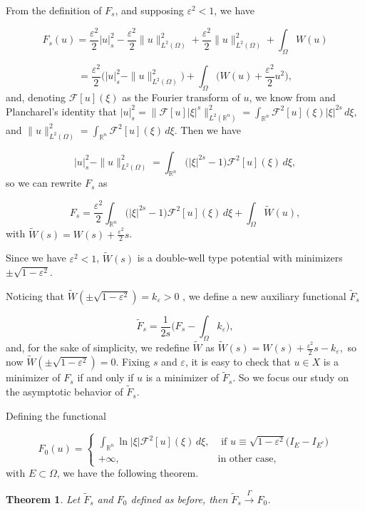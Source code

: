 \documentclass{amsart}
\newcommand{\rn}{{\mathbb{R}^n}}
\newcommand{\e}{\varepsilon}
\newcommand{\ele}{L^2(\Omega)}
\newcommand{\Fu}{\mathcal{F}}
\newtheorem{theorem}{Theorem}[section]
\theoremstyle{remark}
\theoremstyle{definition}
\numberwithin{equation}{section}
\begin{document}
From the definition of $F_s$, and supposing $\e^2<1$, we have 

$$F_s(u) = \frac{\e^2}{2}|u|^2_s - \frac{\e^2}{2}\|u\|^2_{\ele} + \frac{\e^2}{2}\|u\|^2_{\ele} + \int_{\Omega} W(u) $$

$$= \frac{\e^2}{2}\big( |u|^2_s - \|u\|^2_{\ele}\big) + \int_{\Omega} \big( W(u) +\frac{\e^2}{2}u^2 \big), $$
and, denoting $\Fu[u](\xi)$ as the Fourier transform of $u$, we know from \cite{Hitchhikers} and Plancharel's identity that
$|u|^2_s = \|\mathcal{F}[u]|\xi|^s\|^2_{L^2(\rn)} = \int_{\rn} \mathcal{F}^2[u](\xi)|\xi|^{2s} \, d\xi, $
and
$\|u\|^2_{\ele} = \int_{\rn}\mathcal{F}^2[u](\xi)\, d\xi .$
Then we have 

$$|u|^2_s - \|u\|^2_{\ele} = \int_{\rn} \big(|\xi|^{2s} - 1\big)\Fu^2[u](\xi) \, d\xi, $$
so we can rewrite $F_s$ as

$$F_s = \frac{\e^2}{2}\int_{\rn} \big(|\xi|^{2s} - 1\big)\Fu^2[u](\xi) \, d\xi + \int_{\Omega} \tilde{W}(u), $$
with $\tilde{W}(s) =  W(s) +\frac{\e^2}{2}s$. 

Since we have $\e^2<1$, $\tilde{W}(s)$ is a double-well type potential with minimizers $\pm\sqrt{1-\e^2}$.

Noticing that $\tilde{W}(\pm\sqrt{1-\e^2}) = k_{\e}>0$ , we define a new auxiliary functional $\tilde{F}_s$ 

$$\tilde{F}_s  = \frac{1}{2s}\big(F_s - \int_{\Omega}k_{\e} \big),$$
and, for the sake of simplicity, we redefine $\tilde{W}$ as $\tilde{W}(s) =  W(s) +\frac{\e^2}{2}s - k_{\e},$
so now $\tilde{W}(\pm\sqrt{1-\e^2})=0$. 
Fixing $s$ and $\e$, it is easy to check that $u \in X$ is a minimizer of $F_s$ if and only if $u$ is a minimizer of $\tilde{F}_s$. So we focus our study on the asymptotic behavior of $\tilde{F}_s$.     

Defining the functional


\begin{equation}
F_0(u) = \left\lbrace
  \begin{array}{rl}      
 \int_{\rn} \ln{|\xi|} \Fu^2[u](\xi) \, d\xi,  & \text{ if } u \equiv \sqrt{1-\e^2}\big(I_{E} - I_{E^c} \big) \\
 +\infty,  & \text{in other case},
\end{array}
    \right.
\label{eq:funcional}
\end{equation}
with $E \subset \Omega$, we have the following theorem. 

\begin{theorem}
Let $\tilde{F}_s$ and $F_0$ defined as before, then $\tilde{F}_s \xrightarrow[]{\Gamma} F_0$. 
\end{theorem}
\end{document}

